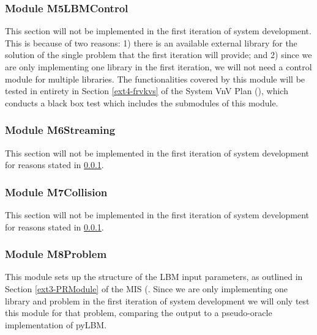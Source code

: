 \documentclass[12pt, titlepage]{article}
\begin{document}
\subsubsection{Module M5LBMControl}
\label{UTDMF}
This section will not be implemented in the first iteration of system development. This is because of two reasons: 1) there is an available external library for the solution of the single problem that the first iteration will provide; and 2) since we are only implementing one library in the first iteration, we will not need a control module for multiple libraries. The functionalities covered by this module will be tested in entirety in Section \ref{ext4-frvkvs} of the System VnV Plan (\citet{LBM_SVNV_PM}), which conducts a black box test which includes the submodules of this module.


\subsubsection{Module M6Streaming}

This section will not be implemented in the first iteration of system development for reasons stated in \ref{UTDMF}.

\subsubsection{Module M7Collision}

This section will not be implemented in the first iteration of system development for reasons stated in \ref{UTDMF}.

\subsubsection{Module M8Problem}

This module sets up the structure of the LBM input parameters, as outlined in Section \ref{ext3-PRModule} of the MIS (\citet{LBM_MIS_PM}. Since we are only implementing one library and problem in the first iteration of system development we will only test this module for that problem, comparing the output to a pseudo-oracle implementation of pyLBM.
\end{document}

